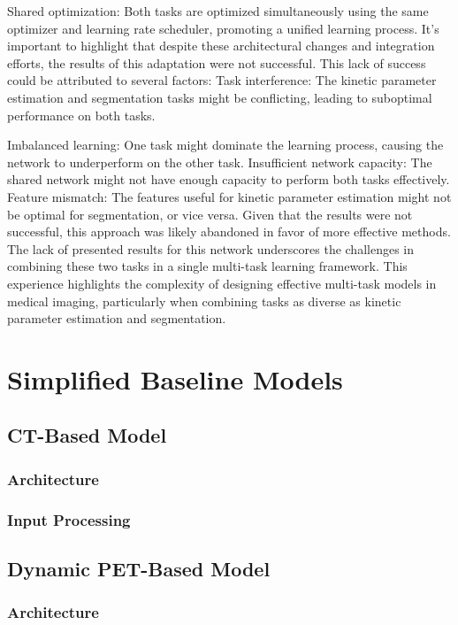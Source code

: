 Shared optimization: Both tasks are optimized simultaneously using the same optimizer and learning rate scheduler, promoting a unified learning process.
It's important to highlight that despite these architectural changes and integration efforts, the results of this adaptation were not successful. This lack of success could be attributed to several factors:
Task interference: The kinetic parameter estimation and segmentation tasks might be conflicting, leading to suboptimal performance on both tasks.

Imbalanced learning: One task might dominate the learning process, causing the network to underperform on the other task.
Insufficient network capacity: The shared network might not have enough capacity to perform both tasks effectively.
Feature mismatch: The features useful for kinetic parameter estimation might not be optimal for segmentation, or vice versa.
Given that the results were not successful, this approach was likely abandoned in favor of more effective methods. The lack of presented results for this network underscores the challenges in combining these two tasks in a single multi-task learning framework. This experience highlights the complexity of designing effective multi-task models in medical imaging, particularly when combining tasks as diverse as kinetic parameter estimation and segmentation.








\section{Simplified Baseline Models}
\subsection{CT-Based Model}
\subsubsection{Architecture}
\subsubsection{Input Processing}

\subsection{Dynamic PET-Based Model}
\subsubsection{Architecture}
